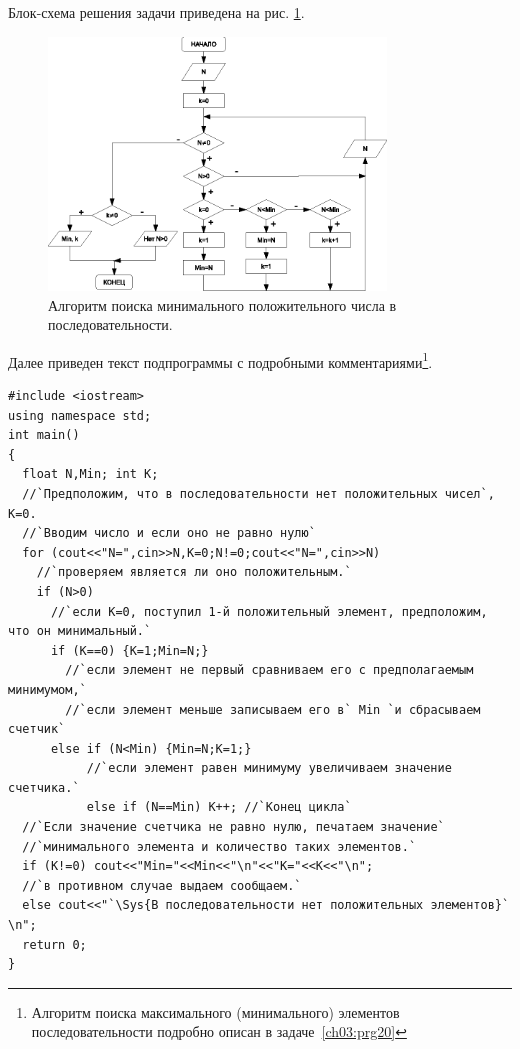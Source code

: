 Блок-схема решения задачи приведена на рис. \ref{ch03:refDrawing34}.
\begin{figure}[htb]
\begin{center}
\includegraphics[width=0.8\textwidth]{img/ris_3_35}
\caption{Алгоритм поиска минимального положительного числа в последовательности.}
\label{ch03:refDrawing34}
\end{center}
\end{figure}

Далее приведен текст подпрограммы с подробными комментариями\footnote{Алгоритм поиска максимального (минимального)
элементов последовательности подробно описан в задаче~\ref{ch03:prg20}}.

\begin{lstlisting}
#include <iostream>
using namespace std;
int main()
{
  float N,Min; int K;
  //`Предположим, что в последовательности нет положительных чисел`, K=0.
  //`Вводим число и если оно не равно нулю`
  for (cout<<"N=",cin>>N,K=0;N!=0;cout<<"N=",cin>>N)
    //`проверяем является ли оно положительным.`
    if (N>0)
      //`если K=0, поступил 1-й положительный элемент, предположим, что он минимальный.`
      if (K==0) {K=1;Min=N;}
        //`если элемент не первый сравниваем его с предполагаемым минимумом,`
        //`если элемент меньше записываем его в` Min `и сбрасываем счетчик`
      else if (N<Min) {Min=N;K=1;}
           //`если элемент равен минимуму увеличиваем значение счетчика.`
           else if (N==Min) K++; //`Конец цикла`
  //`Если значение счетчика не равно нулю, печатаем значение`
  //`минимального элемента и количество таких элементов.`
  if (K!=0) cout<<"Min="<<Min<<"\n"<<"K="<<K<<"\n";
  //`в противном случае выдаем сообщаем.`
  else cout<<"`\Sys{В последовательности нет положительных элементов}` \n";
  return 0;
}
\end{lstlisting}


